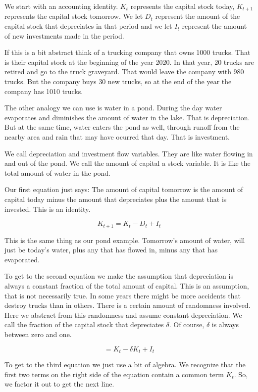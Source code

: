 \documentclass[
]{book}
\begin{document}
We start with an accounting identity. \(K_t\) represents the capital stock today, \(K_{t+1}\) represents the capital stock tomorrow. We let \(D_t\) represent the amount of the capital stock that depreciates in that period and we let \(I_t\) represent the amount of new investments made in the period.

If this is a bit abstract think of a trucking company that owns 1000 trucks. That is their capital stock at the beginning of the year 2020. In that year, 20 trucks are retired and go to the truck graveyard. That would leave the company with 980 trucks. But the company buys 30 new trucks, so at the end of the year the company has 1010 trucks.

The other analogy we can use is water in a pond. During the day water evaporates and diminishes the amount of water in the lake. That is depreciation. But at the same time, water enters the pond as well, through runoff from the nearby area and rain that may have ocurred that day. That is investment.

We call depreciation and investment flow variables. They are like water flowing in and out of the pond. We call the amount of capital a stock variable. It is like the total amount of water in the pond.

Our first equation just says: The amount of capital tomorrow is the amount of capital today minus the amount that depreciates plus the amount that is invested. This is an identity.

\[K_{t+1}=K_t-D_t+I_t\]

This is the same thing as our pond example. Tomorrow's amount of water, will just be today's water, plus any that has flowed in, minus any that has evaporated.

To get to the second equation we make the assumption that depreciation is always a constant fraction of the total amount of capital. This is an assumption, that is not necessarily true. In some years there might be more accidents that destroy trucks than in others. There is a certain amount of randomness involved. Here we abstract from this randomness and assume constant depreciation. We call the fraction of the capital stock that depreciates \(\delta\). Of course, \(\delta\) is always between zero and one.

\[=K_t- \delta K_t+I_t\]

To get to the third equation we just use a bit of algebra. We recognize that the first two terms on the right side of the equation contain a common term \(K_t\). So, we factor it out to get the next line.
\end{document}
